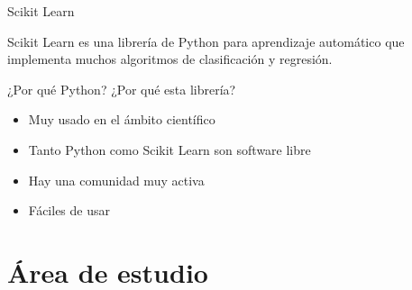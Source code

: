 \documentclass[10pt]{beamer}
\begin{document}
\begin{frame}{Scikit Learn}

  Scikit Learn es una librería de Python para aprendizaje automático que
  implementa muchos algoritmos de clasificación y regresión.

  ¿Por qué Python? ¿Por qué esta librería?

  \begin{itemize}[<+->]
  \item Muy usado en el ámbito científico
  \item Tanto Python como Scikit Learn son software libre
  \item Hay una comunidad muy activa
  \item Fáciles de usar
  \end{itemize}


\end{frame}


\section{Área de estudio}
\end{document}
